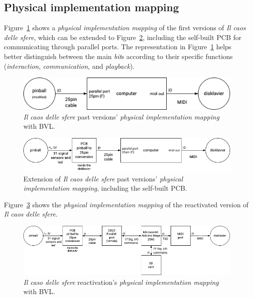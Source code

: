 \subsection*{Physical implementation mapping}
Figure~\ref{fig:ab-mapping-physical} shows a \textit{physical implementation mapping} of the first versions of \textit{Il caos delle sfere}, which can be extended to Figure~\ref{fig:ab-mapping-physical02}, including the self-built PCB for communicating through parallel ports. The representation in Figure~\ref{fig:ab-mapping-physical} helps better distinguish between the main \textit{bit}s according to their specific functions (\textit{interaction}, \textit{communication}, and \textit{playback}).

\begin{figure}[!h]
    \centering
    \includegraphics[width=\linewidth]{chapters/appendix/b/image/graphb-mapping-physical01.png}
    \caption{\textit{Il caos delle sfere} past versions’ \textit{physical implementation mapping} with BVL.}
    \label{fig:ab-mapping-physical}
\end{figure}

\begin{figure}[!h]
    \centering
    \includegraphics[width=\linewidth]{chapters/appendix/b/image/graphb-mapping-physical02.png}
    \caption{Extension of \textit{Il caos delle sfere} past versions’ \textit{physical implementation mapping}, including the self-built PCB.}
    \label{fig:ab-mapping-physical02}
\end{figure}

Figure~\ref{fig:ab-mapping-physical03} shows the \textit{physical implementation mapping} of the reactivated version of \textit{Il caos delle sfere}. 

\begin{figure}[!h]
    \centering
    \includegraphics[width=\linewidth]{chapters/appendix/b/image/graphb-mapping-physical03.png}
    \caption{\textit{Il caso delle sfere} reactivation’s \textit{physical implementation mapping} with BVL.}
    \label{fig:ab-mapping-physical03}
\end{figure}

